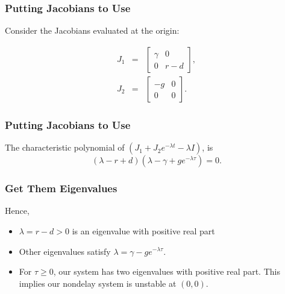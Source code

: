 \begin{frame}\frametitle{Putting Jacobians to Use}
Consider the Jacobians evaluated at the origin:

\begin{eqnarray*}
  J_1 & = & 
            \begin{bmatrix}
              \gamma & 0\\
              0 & r-d
            \end{bmatrix}, \\
  J_2 & = & 
            \begin{bmatrix}
              -g & 0\\
              0 & 0
            \end{bmatrix}.
\end{eqnarray*}

\end{frame}


\begin{frame}[c]\frametitle{Putting Jacobians to Use}

  The characteristic polynomial of
  $(J_1+J_2e^{-\lambda t} -\lambda I)$, is
$$(\lambda - r + d)(\lambda -\gamma + ge^{-\lambda\tau})=0.$$

\end{frame}

\begin{frame}\frametitle{Get Them Eigenvalues}
Hence, 
\begin{itemize}{\itemsep .5in}
\item $\lambda = r-d>0$ is an eigenvalue with positive real part
\item Other eigenvalues satisfy $\lambda=\gamma-ge^{-\lambda\tau}$.
\item For $\tau\geq0$, our system has two eigenvalues with positive
  real part. This implies our nondelay system is unstable at $(0,0)$.
\end{itemize}
\end{frame}

